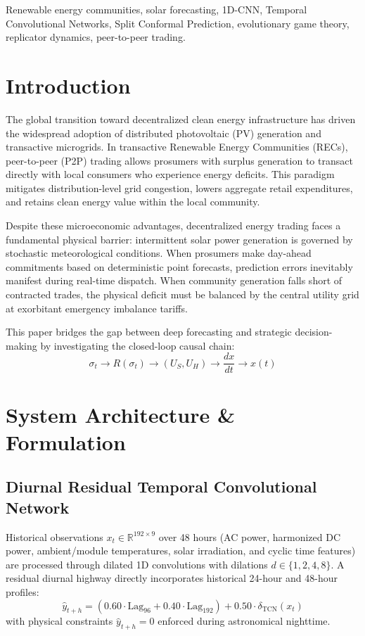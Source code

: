 \documentclass[conference]{IEEEtran}
\begin{document}
\begin{IEEEkeywords}
Renewable energy communities, solar forecasting, 1D-CNN, Temporal Convolutional Networks, Split Conformal Prediction, evolutionary game theory, replicator dynamics, peer-to-peer trading.
\end{IEEEkeywords}

\section{Introduction}
The global transition toward decentralized clean energy infrastructure has driven the widespread adoption of distributed photovoltaic (PV) generation and transactive microgrids. In transactive Renewable Energy Communities (RECs), peer-to-peer (P2P) trading allows prosumers with surplus generation to transact directly with local consumers who experience energy deficits. This paradigm mitigates distribution-level grid congestion, lowers aggregate retail expenditures, and retains clean energy value within the local community.

Despite these microeconomic advantages, decentralized energy trading faces a fundamental physical barrier: intermittent solar power generation is governed by stochastic meteorological conditions. When prosumers make day-ahead commitments based on deterministic point forecasts, prediction errors inevitably manifest during real-time dispatch. When community generation falls short of contracted trades, the physical deficit must be balanced by the central utility grid at exorbitant emergency imbalance tariffs.

This paper bridges the gap between deep forecasting and strategic decision-making by investigating the closed-loop causal chain:
\begin{equation}
\sigma_t \longrightarrow R(\sigma_t) \longrightarrow (U_S, U_H) \longrightarrow \frac{dx}{dt} \longrightarrow x(t)
\end{equation}

\section{System Architecture \& Formulation}
\subsection{Diurnal Residual Temporal Convolutional Network}
Historical observations $x_t \in \mathbb{R}^{192 \times 9}$ over 48 hours (AC power, harmonized DC power, ambient/module temperatures, solar irradiation, and cyclic time features) are processed through dilated 1D convolutions with dilations $d \in \{1, 2, 4, 8\}$. A residual diurnal highway directly incorporates historical 24-hour and 48-hour profiles:
\begin{equation}
\hat{y}_{t+h} = (0.60 \cdot \text{Lag}_{96} + 0.40 \cdot \text{Lag}_{192}) + 0.50 \cdot \delta_{\text{TCN}}(x_t)
\end{equation}
with physical constraints $\hat{y}_{t+h} = 0$ enforced during astronomical nighttime.
\end{document}
